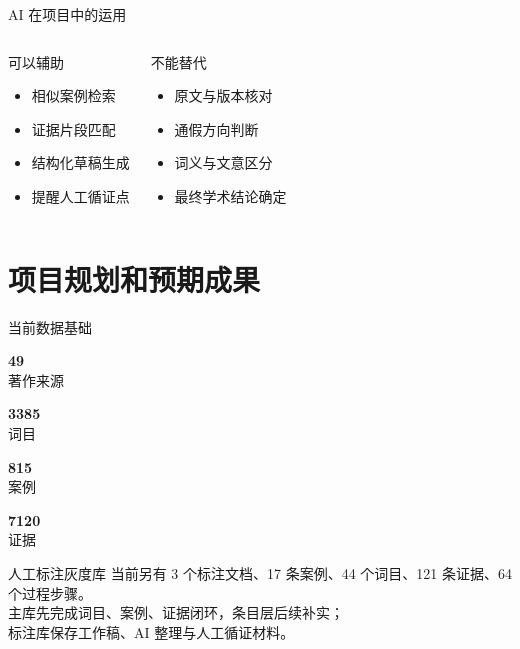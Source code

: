 \documentclass[aspectratio=169]{beamer}
\newcommand{\numstat}[2]{%
  \begin{minipage}{0.22\linewidth}
    \centering
    {\Huge\textcolor{rucRed}{\textbf{#1}}}\\[-1mm]
    {\small #2}
  \end{minipage}
}
\begin{document}
\begin{frame}{AI 在项目中的运用}
    \begin{columns}[T]
        \begin{block}{可以辅助}
            \begin{itemize}
                \item 相似案例检索
                \item 证据片段匹配
                \item 结构化草稿生成
                \item 提醒人工循证点
            \end{itemize}
        \end{block}
        \begin{block}{不能替代}
            \begin{itemize}
                \item 原文与版本核对
                \item 通假方向判断
                \item 词义与文意区分
                \item 最终学术结论确定
            \end{itemize}
        \end{block}
    \end{columns}
\end{frame}

\section{项目规划和预期成果}

\begin{frame}{当前数据基础}
    \vspace{0.25cm}
    \begin{center}
        \numstat{49}{著作来源}
        \numstat{3385}{词目}
        \numstat{815}{案例}
        \numstat{7120}{证据}
    \end{center}
    \vspace{0.6cm}
    \begin{block}{人工标注灰度库}
        当前另有 3 个标注文档、17 条案例、44 个词目、121 条证据、64 个过程步骤。\\
        主库先完成词目、案例、证据闭环，条目层后续补实；\\
        标注库保存工作稿、AI 整理与人工循证材料。
    \end{block}
\end{frame}
\end{document}
